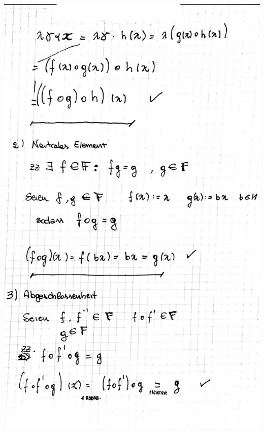 \documentclass[10pt,a4paper]{article}
\begin{document}
\includegraphics[width=\textwidth]{lat5b_2.jpg}
\end{document}
